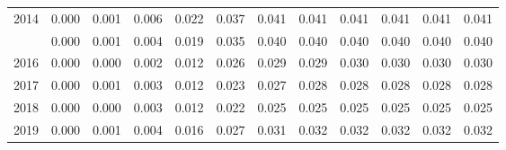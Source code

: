 \documentclass[
]{article}
\begin{document}
\begin{longtable}[t]{lrrrrrrrrrrr}
2014 & 0.000 & 0.001 & 0.006 & 0.022 & 0.037 & 0.041 & 0.041 & 0.041 & 0.041 & 0.041 & 0.041\\
\addlinespace
2015 & 0.000 & 0.001 & 0.004 & 0.019 & 0.035 & 0.040 & 0.040 & 0.040 & 0.040 & 0.040 & 0.040\\
2016 & 0.000 & 0.000 & 0.002 & 0.012 & 0.026 & 0.029 & 0.029 & 0.030 & 0.030 & 0.030 & 0.030\\
2017 & 0.000 & 0.001 & 0.003 & 0.012 & 0.023 & 0.027 & 0.028 & 0.028 & 0.028 & 0.028 & 0.028\\
2018 & 0.000 & 0.000 & 0.003 & 0.012 & 0.022 & 0.025 & 0.025 & 0.025 & 0.025 & 0.025 & 0.025\\
2019 & 0.000 & 0.001 & 0.004 & 0.016 & 0.027 & 0.031 & 0.032 & 0.032 & 0.032 & 0.032 & 0.032\\*
\end{longtable}
\end{document}
